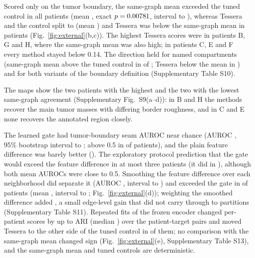 \documentclass[11pt]{article}
\newcommand{\panelref}[2]{Fig.~\ref{#1}(#2)}
\newcommand{\suppanelref}[2]{Supplementary Fig.~#1(#2)}
\begin{document}
Scored only on the tumor boundary, the same-graph mean exceeded the tuned control in all \HerPatients{} patients (mean \HerBndUSixNestedMean{}, exact \(p=0.00781{}\), interval \HerBndUSixNestedLo{} to \HerBndUSixNestedHi{}), whereas Tessera and the control split \HerBndTessNestedPos{} to \HerBndTessNestedNeg{} (mean \HerBndTessNestedMean{}) and Tessera was below the same-graph mean in \HerBndTessUSixNeg{} patients (\panelref{fig:external}{b,c}). The highest Tessera scores were in patients B, G and H, where the same-graph mean was also high; in patients C, E and F every method stayed below 0.14. The direction held for named compartments (same-graph mean above the tuned control in \HerCompUSixNestedPos{} of \HerPatients{}; Tessera below the mean in \HerCompTessUSixNeg{}) and for both variants of the boundary definition (Supplementary Table S10).

The maps show the two patients with the highest and the two with the lowest same-graph agreement (\suppanelref{S9}{a--d}): in B and H the methods recover the main tumor masses with differing border roughness, and in C and E none recovers the annotated region closely.

The learned gate had tumor-boundary seam AUROC near chance (AUROC \HerBndSeamGate{}, 95\% bootstrap interval \HerBndSeamGateLo{} to \HerBndSeamGateHi{}; above 0.5 in \HerBndGateAboveChance{} of \HerPatients{} patients), and the plain feature difference was barely better (\HerBndSeamRaw{}). The exploratory protocol prediction that the gate would exceed the feature difference in at most three patients \HerHTwoVerdict{} (it did in \HerBndGateOverRaw{}), although both mean AUROCs were close to 0.5. Smoothing the feature difference over each neighborhood did separate it (AUROC \HerBndSeamSmooth{}, interval \HerBndSeamSmoothLo{} to \HerBndSeamSmoothHi{}) and exceeded the gate in \HerBndSeamSmoothGatePos{} of \HerPatients{} patients (mean \HerBndSeamSmoothGateMean{}, interval \HerBndSeamSmoothGateLo{} to \HerBndSeamSmoothGateHi{}; \panelref{fig:external}{d}); weighting the smoothed difference added \HerBndSeamSmoothPlainMean{}, a small edge-level gain that did not carry through to partitions (Supplementary Table S11). Repeated fits of the frozen encoder changed per-patient scores by up to \RepMaxRange{} ARI (median \RepMedianRange{}) over the \RepPairs{} patient-target pairs and moved Tessera to the other side of the tuned control in \RepSignChangesControl{} of them; no comparison with the same-graph mean changed sign (\panelref{fig:external}{e}, Supplementary Table S13), and the same-graph mean and tuned controls are deterministic.
\end{document}
